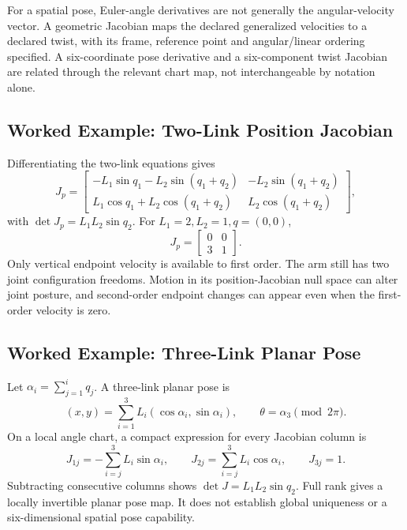 For a spatial pose, Euler-angle derivatives are not generally the angular-velocity vector. A geometric Jacobian maps the declared generalized velocities to a declared twist, with its frame, reference point and angular/linear ordering specified. A six-coordinate pose derivative and a six-component twist Jacobian are related through the relevant chart map, not interchangeable by notation alone.

\subsection{Worked Example: Two-Link Position Jacobian}
\label{example:2link_jacobian}
\label{ex:ex_2link_jacobian}

Differentiating the two-link equations gives
\begin{equation}
 J_p=\begin{bmatrix}
 -L_1\sin q_1-L_2\sin(q_1+q_2)&-L_2\sin(q_1+q_2)\\
 L_1\cos q_1+L_2\cos(q_1+q_2)&L_2\cos(q_1+q_2)
 \end{bmatrix},
\end{equation}
with $\det J_p=L_1L_2\sin q_2$. For $L_1=2,L_2=1,q=(0,0)$,
\begin{equation}
 J_p=\begin{bmatrix}0&0\\3&1\end{bmatrix}.
\end{equation}
Only vertical endpoint velocity is available to first order. The arm still has two joint configuration freedoms. Motion in its position-Jacobian null space can alter joint posture, and second-order endpoint changes can appear even when the first-order velocity is zero.

\subsection{Worked Example: Three-Link Planar Pose}
\label{example:3link_jacobian}
\label{ex:ex_3link_jacobian}

Let $\alpha_i=\sum_{j=1}^i q_j$. A three-link planar pose is
\begin{equation}
 (x,y)=\sum_{i=1}^3L_i(\cos\alpha_i,\sin\alpha_i),\qquad
 \theta=\alpha_3\pmod{2\pi}.
\end{equation}
On a local angle chart, a compact expression for every Jacobian column is
\begin{equation}
 J_{1j}=-\sum_{i=j}^3L_i\sin\alpha_i,\qquad
 J_{2j}=\sum_{i=j}^3L_i\cos\alpha_i,\qquad J_{3j}=1.
\end{equation}
Subtracting consecutive columns shows $\det J=L_1L_2\sin q_2$. Full rank gives a locally invertible planar pose map. It does not establish global uniqueness or a six-dimensional spatial pose capability.

